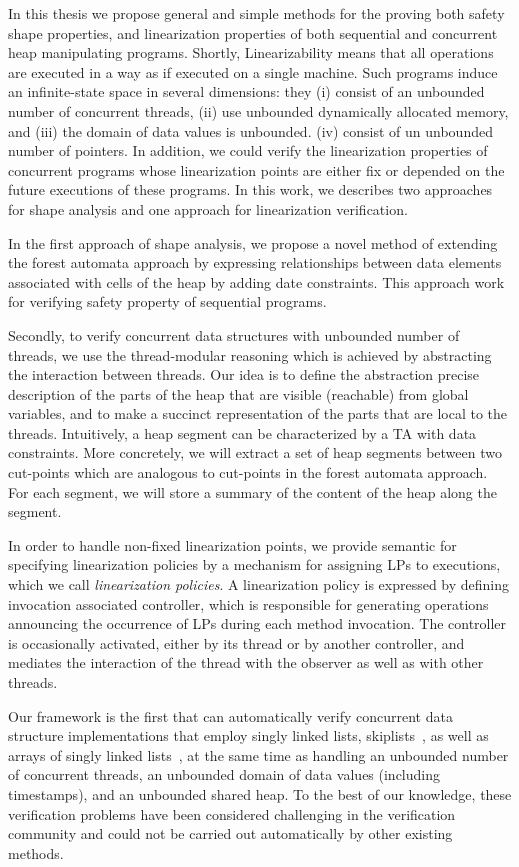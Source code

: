 
In this thesis we propose general and simple methods for the proving both safety shape properties, and linearization properties of
both sequential and concurrent heap manipulating programs. Shortly, Linearizability means that all operations are executed in a way as if executed on a single machine.
Such programs induce an infinite-state space in several dimensions:
they %
(i) consist of an unbounded number of concurrent threads, %
(ii) use unbounded dynamically allocated memory, and %
(iii) the domain of data values is unbounded. %
(iv) consist of un unbounded number of pointers. 
In addition, we could verify the linearization properties of concurrent programs whose linearization points are either fix or depended on the future executions of these programs. In this work, we describes two approaches for shape analysis and one approach for linearization verification.

In the first approach of shape analysis, we propose a novel method of extending the forest automata approach \cite{foresterfull} by expressing relationships between data elements associated with cells of the heap 
by adding date constraints. This approach work for verifying safety property of sequential programs.

Secondly, to verify concurrent data structures with unbounded number of threads, we use the thread-modular reasoning	which is achieved by abstracting the interaction between threads. Our idea is to define the abstraction precise description of the parts of the heap that are visible (reachable) from global variables, and to make a succinct representation of the parts that are local to the threads. Intuitively, a heap segment can be characterized by a TA with data constraints. More concretely, we will extract a set of heap segments between two cut-points which are analogous to cut-points in the forest automata approach. For each segment, we will store a summary of the content of the heap along the segment.

In order to handle non-fixed linearization points, we provide semantic for specifying linearization policies by a mechanism for assigning LPs to executions, which we call \emph{linearization policies}. 
A linearization policy is expressed by defining invocation associated controller, which is responsible for generating operations announcing the occurrence of LPs during each method invocation. The controller is occasionally activated, either by its thread or by another controller, and mediates the interaction of the thread with the
observer as well as with other threads.
 
Our framework is the first that
can automatically verify concurrent data structure implementations that employ
singly linked lists, skiplists~\cite{Fomitchev:2004,ArtOfMpP,Sundell:2005},
as well as arrays of singly linked lists~\cite{ts-stack},
at the same time as handling an unbounded
number of concurrent threads, an unbounded domain of data values
(including timestamps), and an unbounded shared heap. To the best of our knowledge, these verification problems have been
considered challenging in the verification community and
could not be carried out automatically by other existing methods.

